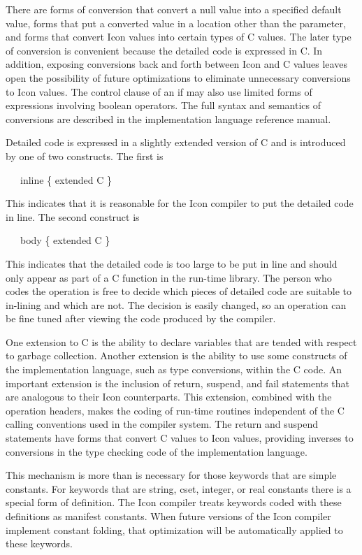 There are forms of conversion that convert a null value into a
specified default value, forms that put a converted value in a
location other than the parameter, and forms that convert Icon values
into certain types of C values. The later type of conversion is
convenient because the detailed code is expressed in C. In addition,
exposing conversions back and forth between Icon and C values leaves
open the possibility of future optimizations to eliminate unnecessary
conversions to Icon values. The control clause of an if may also use
limited forms of expressions involving boolean operators. The full
syntax and semantics of conversions are described in the
implementation language reference manual.

Detailed code is expressed in a slightly extended version of C and is
introduced by one of two constructs. The first is


{\ttfamily\mdseries
\ \ \ inline \{ extended C \}}


This indicates that it is reasonable for the Icon compiler to put the
detailed code in line. The second construct is

{\ttfamily\mdseries
\ \ \ body \{ extended C \}}


This indicates that the detailed code is too large to be put in line
and should only appear as part of a C function in the run-time
library. The person who codes the operation is free to decide which
pieces of detailed code are suitable to in-lining and which are
not. The decision is easily changed, so an operation can be fine tuned
after viewing the code produced by the compiler.

One extension to C is the ability to declare variables that are tended
with respect to garbage collection. Another extension is the ability
to use some constructs of the implementation language, such as type
conversions, within the C code. An important extension is the
inclusion of return, suspend, and fail statements that are analogous
to their Icon counterparts. This extension, combined with the
operation headers, makes the coding of run-time routines independent
of the C calling conventions used in the compiler system. The return
and suspend statements have forms that convert C values to Icon
values, providing inverses to conversions in the type checking code of
the implementation language.

This mechanism is more than is necessary for those keywords that are
simple constants. For keywords that are string, cset, integer, or real
constants there is a special form of definition. The Icon compiler
treats keywords coded with these definitions as manifest
constants. When future versions of the Icon compiler implement
constant folding, that optimization will be automatically applied to
these keywords.


